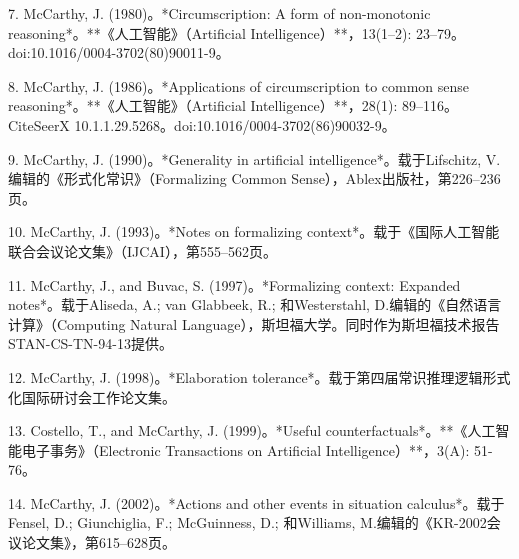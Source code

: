 7. McCarthy, J. (1980)。*Circumscription: A form of non-monotonic reasoning*。**《人工智能》（Artificial Intelligence）**，13(1–2): 23–79。doi:10.1016/0004-3702(80)90011-9。

8. McCarthy, J. (1986)。*Applications of circumscription to common sense reasoning*。**《人工智能》（Artificial Intelligence）**，28(1): 89–116。CiteSeerX 10.1.1.29.5268。doi:10.1016/0004-3702(86)90032-9。

9. McCarthy, J. (1990)。*Generality in artificial intelligence*。载于Lifschitz, V.编辑的《形式化常识》（Formalizing Common Sense），Ablex出版社，第226–236页。

10. McCarthy, J. (1993)。*Notes on formalizing context*。载于《国际人工智能联合会议论文集》（IJCAI），第555–562页。

11. McCarthy, J., and Buvac, S. (1997)。*Formalizing context: Expanded notes*。载于Aliseda, A.; van Glabbeek, R.; 和Westerstahl, D.编辑的《自然语言计算》（Computing Natural Language），斯坦福大学。同时作为斯坦福技术报告STAN-CS-TN-94-13提供。

12. McCarthy, J. (1998)。*Elaboration tolerance*。载于第四届常识推理逻辑形式化国际研讨会工作论文集。

13. Costello, T., and McCarthy, J. (1999)。*Useful counterfactuals*。**《人工智能电子事务》（Electronic Transactions on Artificial Intelligence）**，3(A): 51-76。

14. McCarthy, J. (2002)。*Actions and other events in situation calculus*。载于Fensel, D.; Giunchiglia, F.; McGuinness, D.; 和Williams, M.编辑的《KR-2002会议论文集》，第615–628页。